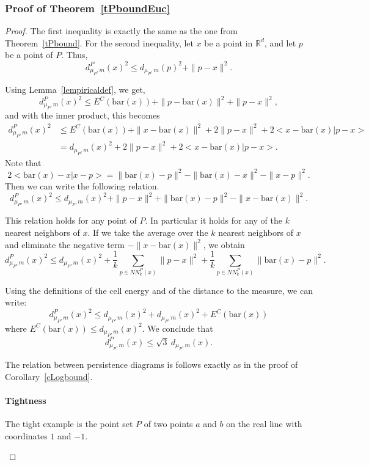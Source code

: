 \documentclass[a4paper]{article}
\newcommand\norm[1]{\|#1\|}
\newcommand\bary[1]{\mathrm{bar}(#1)}
\newcommand\dmP{d_{\mu_P,m}}
\newcommand\dPP{d_{\mu_P,m}^P}
\newcommand\R{\mathbb{R}}
\begin{document}
\subsubsection{Proof of Theorem~\ref{tPboundEuc}}

\begin{proof}
The first inequality is exactly the same as the one from Theorem~\ref{tPbound}.
For the second inequality, let $x$ be a point in $\R^d$, and let $p$ be a point of $P$.
Thus,
\[
  \dPP(x)^2\leq \dmP(p)^2+\norm{p-x}^2.
\]

Using Lemma~\ref{lempiricaldef}, we get, 
\[
  \dPP(x)^2\leq E^C(\bary{x})+\norm{p-\bary{x}}^2+\norm{p-x}^2,
\]
and with the inner product, this becomes
\begin{align*}
  \dPP(x)^2
    &\leq E^C(\bary{x})+\norm{x-\bary{x}}^2+2\norm{p-x}^2+2<x-\bary{x}|p-x>\\
    &=\dmP(x)^2+2\norm{p-x}^2+2<x-\bary{x}|p-x>.
\end{align*}
Note that 
\[
  2<\bary{x}-x|x-p>=\norm{\bary{x}-p}^2-\norm{\bary{x}-x}^2-\norm{x-p}^2.
\]
Then we can write the following relation. 
\[
  \dPP(x)^2\leq \dmP(x)^2+\norm{p-x}^2+\norm{\bary{x}-p}^2-\norm{x-\bary{x}}^2.
\]

This relation holds for any point of $P$. 
In particular it holds for any of the $k$ nearest neighbors of $x$. 
If we take the average over the $k$ nearest neighbors of $x$ and eliminate the negative term $-\norm{x-\bary{x}}^2$, we obtain
\[
  \dPP(x)^2 \leq \dmP(x)^2+\frac{1}{k}\sum_{p\in NN_k^P(x)} \norm{p-x}^2+ \frac{1}{k}\sum_{p\in NN_k^P(x)}\norm{\bary{x}-p}^2.
\]

Using the definitions of the cell energy and of the distance to the measure, we can write: $$\dPP(x)^2\leq \dmP(x)^2+\dmP(x)^2+E^C(\bary{x})$$
where $E^C(\bary{x})\leq\dmP(x)^2$.
We conclude that 
\[
  \dPP(x)\leq \sqrt{3}\ \dmP(x).
\]

The relation between persistence diagrams is follows exactly as in the proof of Corollary~\ref{cLogbound}.

\paragraph{Tightness\\}
The tight example is the point set $P$ of two points $a$ and $b$ on the real line with coordinates $1$ and $-1$.
\begin{center}
\end{center}


\end{proof}
\end{document}
